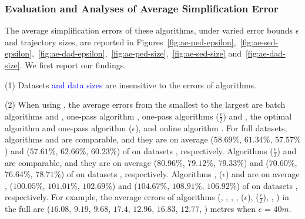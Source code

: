 






\subsubsection{Evaluation and Analyses of Average Simplification Error}
\label{sec-ae}
The average simplification errors of these algorithms, under varied error bounds $\epsilon$ and trajectory sizes, are reported in Figures~\ref{fig:ae-ped-epsilon},~\ref{fig:ae-sed-epsilon},~\ref{fig:ae-dad-epsilon},~\ref{fig:ae-ped-size},~\ref{fig:ae-sed-size} and~\ref{fig:ae-dad-size}.
We first report our findings.

\sstab (1) {Datasets \textcolor{blue}{and data sizes} are insensitive to the errors of \lsa algorithms.}

\sstab (2) When using \ped, the average errors from the smallest
to the largest are batch algorithms \tpa and \dpa, one-pass
algorithm , one-pass
algorithms \siped($\frac{\epsilon}{2}$) and \operb, the optimal algorithm \opt and one-pass algorithm \siped(${\epsilon}$), and online algorithm \bqsa.
%
For full datasets, algorithms \tpa and \dpa are comparable, and they are on average ($58.69\%$, $61.34\%$,
$57.57\%$) and ($57.61\%$, $62.66\%$, $60.23\%$) of \opt on datasets \dSets, respectively.
Algorithms \siped($\frac{\epsilon}{2}$) and \operb are comparable, and they are on average
($80.96\%$, $79.12\%$, $79.33\%$) and ($70.60\%$, $76.64\%$, $78.71\%$) of \opt on datasets \dSets, respectively.
%
Algorithms , \siped(${\epsilon}$) and \bqsa are on average , ($100.05\%$, $101.01\%$, $102.69\%$) and ($104.67\%$, $108.91\%$, $106.92\%$) of \opt on datasets \dSets, respectively.
For example, the average errors of algorithms
(\opt, \tpa, \dpa, \bqsa, \siped(${\epsilon}$), \siped($\frac{\epsilon}{2}$), \operb,  ) in the full \mopsi are ($16.08$, $9.19$, $9.68$, $17.4$, $12.96$, $16.83$, $12.77$, ) metres when $\epsilon$ = $40m$.

